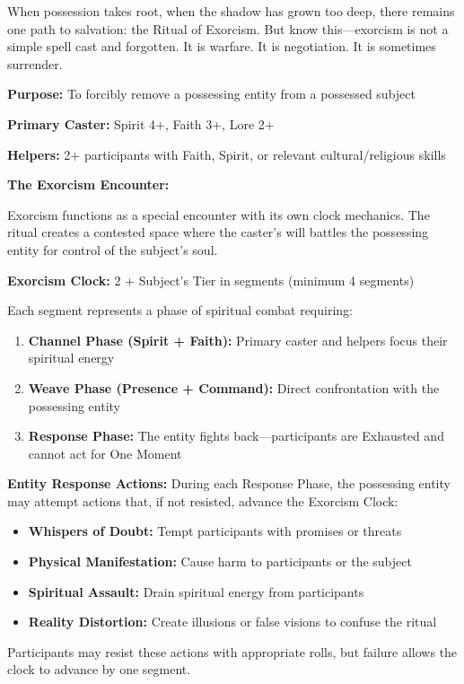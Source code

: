 \documentclass[12pt,twoside]{book}
\begin{document}
When possession takes root, when the shadow has grown too deep, there remains one path to salvation: the Ritual of Exorcism. But know this—exorcism is not a simple spell cast and forgotten. It is warfare. It is negotiation. It is sometimes surrender.

\textbf{Purpose:} To forcibly remove a possessing entity from a possessed subject

\textbf{Primary Caster:} Spirit 4+, Faith 3+, Lore 2+

\textbf{Helpers:} 2+ participants with Faith, Spirit, or relevant cultural/religious skills

\textbf{The Exorcism Encounter:}

Exorcism functions as a special encounter with its own clock mechanics. The ritual creates a contested space where the caster's will battles the possessing entity for control of the subject's soul.

\textbf{Exorcism Clock:} 2 + Subject's Tier in segments (minimum 4 segments)

Each segment represents a phase of spiritual combat requiring:
\begin{enumerate}
\item \textbf{Channel Phase (Spirit + Faith):} Primary caster and helpers focus their spiritual energy
\item \textbf{Weave Phase (Presence + Command):} Direct confrontation with the possessing entity
\item \textbf{Response Phase:} The entity fights back—participants are Exhausted and cannot act for One Moment
\end{enumerate}

\textbf{Entity Response Actions:}
During each Response Phase, the possessing entity may attempt actions that, if not resisted, advance the Exorcism Clock:
\begin{itemize}
\item \textbf{Whispers of Doubt:} Tempt participants with promises or threats
\item \textbf{Physical Manifestation:} Cause harm to participants or the subject
\item \textbf{Spiritual Assault:} Drain spiritual energy from participants
\item \textbf{Reality Distortion:} Create illusions or false visions to confuse the ritual
\end{itemize}

Participants may resist these actions with appropriate rolls, but failure allows the clock to advance by one segment.
\end{document}
